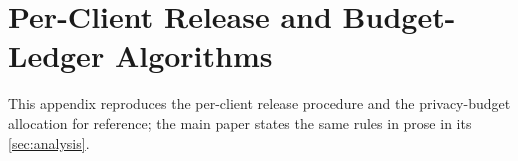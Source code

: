 \documentclass[a4paper,fleqn]{cas-dc}
\begin{document}
\section{Per-Client Release and Budget-Ledger Algorithms}
\label{app:algs}
This appendix reproduces the per-client release procedure and the
privacy-budget allocation for reference; the main paper states the same
rules in prose in its \cref{sec:analysis}.


\end{document}
